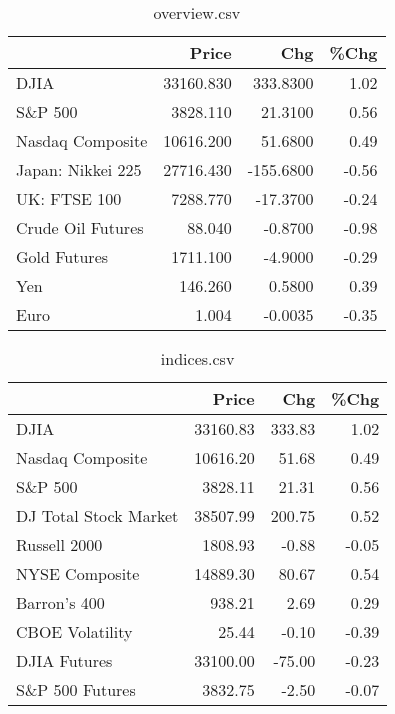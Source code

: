 \documentclass{article}%
\begin{document}
\begin{table}[htbp]%
\caption{overview.csv}%
\centering%
\begin{adjustbox}{width=1\textwidth}%
\begin{tabular}{lrrr}
\toprule
                  &     Price &       Chg &  \%Chg \\
\midrule
             DJIA & 33160.830 &  333.8300 &  1.02 \\
          S\&P 500 &  3828.110 &   21.3100 &  0.56 \\
 Nasdaq Composite & 10616.200 &   51.6800 &  0.49 \\
Japan: Nikkei 225 & 27716.430 & -155.6800 & -0.56 \\
     UK: FTSE 100 &  7288.770 &  -17.3700 & -0.24 \\
Crude Oil Futures &    88.040 &   -0.8700 & -0.98 \\
     Gold Futures &  1711.100 &   -4.9000 & -0.29 \\
              Yen &   146.260 &    0.5800 &  0.39 \\
             Euro &     1.004 &   -0.0035 & -0.35 \\
\bottomrule
\end{tabular}
%
\end{adjustbox}%
\end{table}

%


\begin{table}[htbp]%
\caption{indices.csv}%
\centering%
\begin{adjustbox}{width=1\textwidth}%
\begin{tabular}{lrrr}
\toprule
                      &    Price &    Chg &  \%Chg \\
\midrule
                 DJIA & 33160.83 & 333.83 &  1.02 \\
     Nasdaq Composite & 10616.20 &  51.68 &  0.49 \\
              S\&P 500 &  3828.11 &  21.31 &  0.56 \\
DJ Total Stock Market & 38507.99 & 200.75 &  0.52 \\
         Russell 2000 &  1808.93 &  -0.88 & -0.05 \\
       NYSE Composite & 14889.30 &  80.67 &  0.54 \\
         Barron's 400 &   938.21 &   2.69 &  0.29 \\
      CBOE Volatility &    25.44 &  -0.10 & -0.39 \\
         DJIA Futures & 33100.00 & -75.00 & -0.23 \\
      S\&P 500 Futures &  3832.75 &  -2.50 & -0.07 \\
\bottomrule
\end{tabular}
%
\end{adjustbox}%
\end{table}
\end{document}
